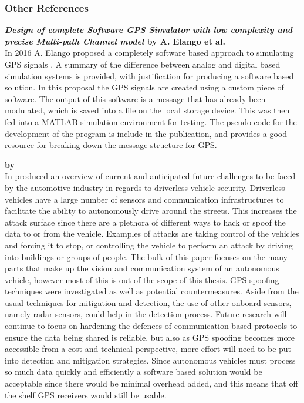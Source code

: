 
\subsubsection{Other References}

\textbf{\emph{Design of complete Software GPS Simulator with low complexity and precise Multi-path Channel model} by A. Elango et al.} \\ 
In 2016 A. Elango proposed a completely software based approach to simulating GPS signals \cite{RN15}. A summary of the difference between analog
and digital based simulation systems is provided, with justification for producing a software based solution. In this proposal the GPS signals are created
using a custom piece of software. The output of this software is a message that has already been modulated, which is saved into a file on the local
storage device. This was then fed into a MATLAB simulation environment for testing. The pseudo code for the development of the program is include in
the publication, and provides a good resource for breaking down the message structure for GPS.

\medskip

\textbf{\emph{} by \citeauthor{RN25}} \\
In \citeyear{RN25} \citeauthor{RN25} \cite{RN25} produced an overview of current and anticipated future challenges to be faced by the automotive industry in regards to
driverless vehicle security. Driverless vehicles have a large number of sensors and communication infrastructures to facilitate the ability to autonomously drive around
the streets. This increases the attack surface since there are a plethora of different ways to hack or spoof the data to or from the vehicle. Examples of attacks are taking
control of the vehicles and forcing it to stop, or controlling the vehicle to perform an attack by driving into buildings or groups of people. The bulk of this paper
focuses on the many parts that make up the vision and communication system of an autonomous vehicle, however most of this is out of the scope of this thesis. GPS spoofing
techniques were investigated as well as potential countermeasures. Aside from the usual techniques for mitigation and detection, the use of other onboard sensors, namely
radar sensors, could help in the detection process. Future research will continue to focus on hardening the defences of communication based protocols to ensure the data
being shared is reliable, but also as GPS spoofing becomes more accessible from a cost and technical perspective, more effort will need to be put into detection and
mitigation strategies. Since autonomous vehicles must process so much data quickly and efficiently a software based solution would be acceptable since there would be
minimal overhead added, and this means that off the shelf GPS receivers would still be usable. 

